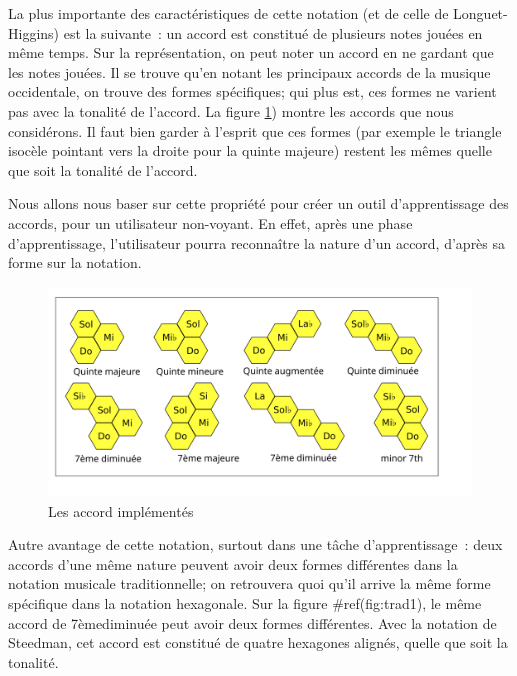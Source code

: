 \documentclass[
]{book}
\begin{document}
La plus importante des caractéristiques de cette notation (et de celle de
Longuet-Higgins) est la suivante~: un accord est constitué de plusieurs notes
jouées en même temps. Sur la représentation, on peut noter un accord en ne
gardant que les notes jouées. Il se trouve qu'en notant les principaux
accords de la musique occidentale, on trouve des formes spécifiques; qui plus
est, ces formes ne varient pas avec la tonalité de l'accord. La
figure \ref{fig:chords}) montre les
accords que nous considérons. Il faut bien garder à l'esprit que ces formes
(par exemple le triangle isocèle pointant vers la droite pour la quinte
majeure) restent les mêmes quelle que soit la tonalité de l'accord.

Nous allons nous baser sur cette propriété pour créer un outil
d'apprentissage des accords, pour un utilisateur non-voyant. En effet, après
une phase d'apprentissage, l'utilisateur pourra reconnaître la nature d'un
accord, d'après sa forme sur la notation.

\begin{figure}
\centering
\includegraphics{img/chords_eng.svg}
\caption{\label{fig:chords}Les accord implémentés}
\end{figure}

Autre avantage de cette notation, surtout dans une tâche
d'apprentissage~: deux accords d'une même nature peuvent avoir deux
formes différentes dans la notation musicale traditionnelle; on retrouvera
quoi qu'il arrive la même forme spécifique dans la notation hexagonale. Sur
la figure \#ref(fig:trad1), le même
accord de 7èmediminuée peut avoir deux formes
différentes. Avec la notation de Steedman, cet accord est constitué de quatre
hexagones alignés, quelle que soit la tonalité.
\end{document}
